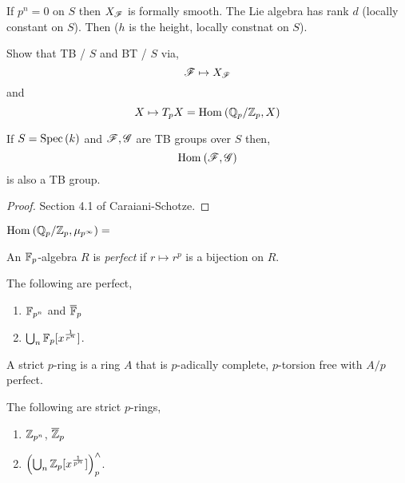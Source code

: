 \documentclass[12pt]{article}
\begin{document}
\begin{center}
\end{center}
If $p^n = 0$ on $S$ then $X_{\mathscr{F}}$ is formally smooth. The Lie algebra has rank $d$ (locally constant on $S$). Then ($h$ is the height, locally constnat on $S$). 

\begin{prop}
Show that TB / $S$ and BT / $S$ via,
\[ \mathscr{F} \mapsto X_{\mathscr{F}} \]
and
\[ X \mapsto T_p X = \mathrm{Hom}_{} \left( \mathbb{Q}_p/\mathbb{Z}_p, X \right) \]
\end{prop}

\begin{prop}
If $S = \mathrm{Spec}\left( k \right)$ and $\mathscr{F}, \mathscr{G}$ are TB groups over $S$ then,
\[ \mathrm{Hom}_{} \left( \mathscr{F}, \mathscr{G} \right) \]
is also a TB group. 
\end{prop}

\begin{proof}
Section 4.1 of Caraiani-Schotze.
\end{proof}

\begin{example}
$\mathrm{Hom}_{} \left( \mathbb{Q}_p/\mathbb{Z}_p, \mu_{p^\infty} \right) =$
\end{example}

\begin{defn}
An $\mathbb{F}_p$-algebra $R$ is \textit{perfect} if $r \mapsto r^p$ is a bijection on $R$.
\end{defn}

\begin{example}
The following are perfect,
\begin{enumerate}
\item $\mathbb{F}_{p^n}$ and $\overline{\mathbb{F}}_p$
\item $\bigcup_n \mathbb{F}_p[x^{\frac{1}{p^n}}]$.
\end{enumerate}
\end{example}

\begin{defn}
A strict $p$-ring is a ring $A$ that is $p$-adically complete, $p$-torsion free with $A / p$ perfect.
\end{defn}

\begin{example}
The following are strict $p$-rings,
\begin{enumerate}
\item $\mathbb{Z}_{p^n}$, $\overline{\mathbb{Z}}_p$
\item $\left( \bigcup_n \mathbb{Z}_p [x^{\frac{1}{p^n}}] \right)^{\wedge}_p$.
\end{enumerate}
\end{example}
\end{document}
